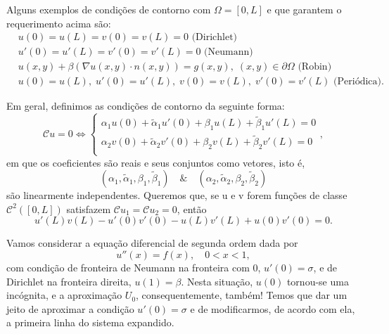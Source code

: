 \documentclass[../differential_methods.tex]{subfiles}
\begin{document}
\begin{tcolorbox}[
		skin=enhanced,
		title=Lembrete!,
		after title={\hfill Condições de Contorno},
		fonttitle=\bfseries,
		sharp corners=downhill,
		colframe=black,
		colbacktitle=yellow!75!white,
		colback=yellow!30,
		colbacklower=black,
		coltitle=black,
		drop large lifted shadow
	]
	Alguns exemplos de \hypertarget{boundary_conditions}{condições de contorno} com \(\Omega = [0, L]\) e que garantem o requerimento acima são:
	\begin{align*}
		 & u(0) = u(L) = v(0) = v(L) = 0 \text{ (Dirichlet)}                                                  \\
		 & u'(0) = u'(L) = v'(0) = v'(L) = 0 \text{ (Neumann)}                                                \\
		 & u(x, y)+\beta (\nabla u(x, y)\cdot n(x, y)) = g(x, y),\; (x, y)\in \partial \Omega \text{ (Robin)} \\
		 & u(0) = u(L),\; u'(0) = u'(L), \; v(0) = v(L),\; v'(0) = v'(L) \text{ (Periódica)}.
	\end{align*}

	Em geral, definimos as condições de contorno da seguinte forma:
	\[
		\mathcal{C}u = 0 \Longleftrightarrow \left\{\begin{array}{ll}
			\alpha_1 u(0) + \tilde{\alpha }_1u'(0) + \beta_1u(L) + \tilde{\beta }_1u'(L) = 0 \\
			\alpha_2 v(0) + \tilde{\alpha }_2v'(0) + \beta_2v(L) + \tilde{\beta }_2v'(L) = 0 \\
		\end{array}\right.,
	\]
	em que os coeficientes são reais e seus conjuntos como vetores, isto é,
	\[
		(\alpha_1, \tilde{\alpha }_1, \beta_1, \tilde{\beta }_1) \quad\&\quad (\alpha_2, \tilde{\alpha }_2, \beta_2, \tilde{\beta }_2)
	\]
	são linearmente independentes. Queremos que, se u e v forem funções de classe \(\mathcal{C}^{2}([0, L])\) satisfazem \(\mathcal{C}u_1 = \mathcal{C}u_2 = 0\), então
	\[
		u'(L)v(L) - u'(0)v'(0) - u(L)v'(L) + u(0)v'(0) = 0.
	\]
\end{tcolorbox}

Vamos considerar a equação diferencial de segunda ordem dada por
\[
	u''(x) = f(x), \quad 0<x<1,
\]
com condição de fronteira de Neumann na fronteira com 0, \(u'(0)= \sigma \), e de Dirichlet na fronteira direita, \(u(1)=\beta \). Nesta situação, \(u(0)\) tornou-se uma incógnita, e a aproximação \(U_{0}\), consequentemente, também! Temos que dar um jeito de aproximar a condição \(u'(0)=\sigma \) e de modificarmos, de acordo com ela, a primeira linha do sistema expandido.
\end{document}

